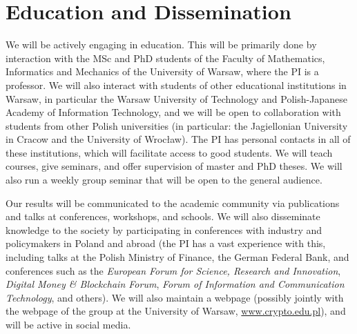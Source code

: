 \documentclass{article}
\begin{document}
\section{Education and Dissemination}

We will be actively engaging in education. This will be primarily done by interaction with the MSc and PhD students of the Faculty of Mathematics, Informatics and Mechanics of the University of Warsaw, where the PI is a professor. We will also interact with students of other educational institutions in Warsaw, in particular the Warsaw University of Technology and Polish-Japanese Academy of Information Technology, and we will be open to collaboration with students from other Polish universities (in particular: the Jagiellonian University in Cracow and the University of Wrocław). The PI has personal contacts in all of these institutions, which will facilitate access to good students. We will teach courses, give seminars, and offer supervision of master and PhD theses. We will also run a weekly group seminar that will be open to the general audience.

Our results will be communicated to the academic community via publications and talks at conferences, workshops, and schools. We will also disseminate knowledge to the society by participating in conferences with industry and policymakers in Poland and abroad (the PI has a vast experience with this, including talks at the Polish Ministry of Finance, the German Federal Bank, and conferences such as the \emph{European Forum for Science, Research and Innovation}, \emph{Digital Money \& Blockchain Forum}, \emph{Forum of Information and Communication Technology}, and others).
We will also maintain a webpage (possibly jointly with the webpage of the group at the University of Warsaw, \url{www.crypto.edu.pl}), and will be active in social media.




\printbibliography
\end{document}

